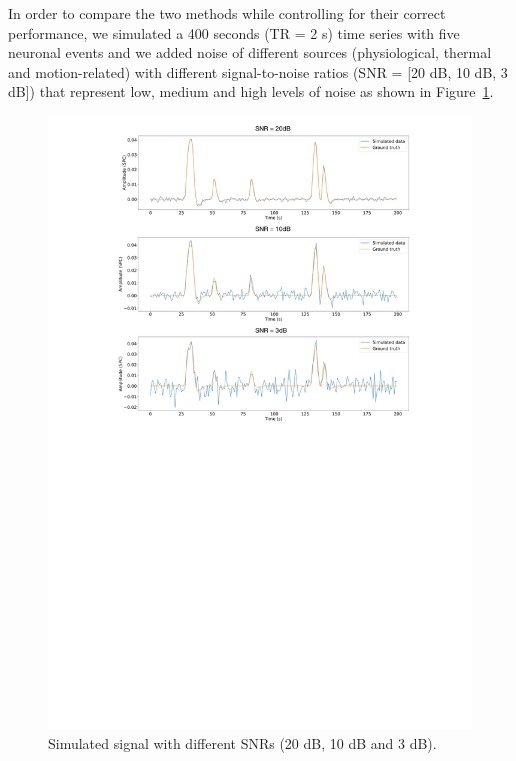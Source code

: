 In order to compare the two methods while controlling for their correct performance, we simulated a 400 seconds (TR = 2 s) time series with five neuronal events and we added noise of different sources (physiological, thermal and motion-related) with different signal-to-noise ratios (SNR = [20 dB, 10 dB, 3 dB]) that represent low, medium and high levels of noise as shown in Figure~\ref{fig:simulations}.

\begin{figure}[h]
    \begin{center}
        \includegraphics[width=\columnwidth]{figures/sim.pdf}
    \end{center}
    \caption{Simulated signal with different SNRs (20 dB, 10 dB and 3 dB).}
\label{fig:simulations}
\end{figure}

